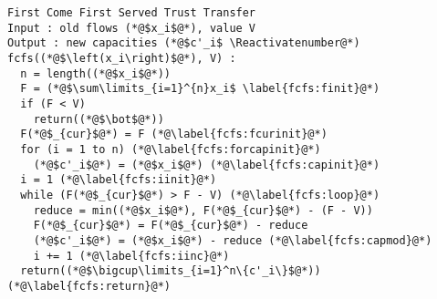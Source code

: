 \Suppressnumber
\begin{lstlisting}[label=fcfs, style=numbers]
First Come First Served Trust Transfer
Input : old flows (*@$x_i$@*), value V
Output : new capacities (*@$c'_i$ \Reactivatenumber@*)
fcfs((*@$\left(x_i\right)$@*), V) :
  n = length((*@$x_i$@*))
  F = (*@$\sum\limits_{i=1}^{n}x_i$ \label{fcfs:finit}@*)
  if (F < V)
    return((*@$\bot$@*))
  F(*@$_{cur}$@*) = F (*@\label{fcfs:fcurinit}@*)
  for (i = 1 to n) (*@\label{fcfs:forcapinit}@*)
    (*@$c'_i$@*) = (*@$x_i$@*) (*@\label{fcfs:capinit}@*)
  i = 1 (*@\label{fcfs:iinit}@*)
  while (F(*@$_{cur}$@*) > F - V) (*@\label{fcfs:loop}@*)
    reduce = min((*@$x_i$@*), F(*@$_{cur}$@*) - (F - V))
    F(*@$_{cur}$@*) = F(*@$_{cur}$@*) - reduce
    (*@$c'_i$@*) = (*@$x_i$@*) - reduce (*@\label{fcfs:capmod}@*)
    i += 1 (*@\label{fcfs:iinc}@*)
  return((*@$\bigcup\limits_{i=1}^n\{c'_i\}$@*)) (*@\label{fcfs:return}@*)
\end{lstlisting}
